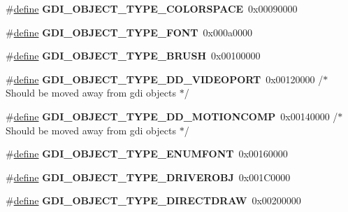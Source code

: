 \begin{DoxyCompactItemize}
\item 
\mbox{\label{group___g_d_i_ga6c5fb2b326a246390108711a94af6914}} 
\#\hyperlink{structdefine}{define} {\bfseries G\+D\+I\+\_\+\+O\+B\+J\+E\+C\+T\+\_\+\+T\+Y\+P\+E\+\_\+\+C\+O\+L\+O\+R\+S\+P\+A\+CE}~0x00090000
\item 
\mbox{\label{group___g_d_i_gabd2c418955f21cc36490373c88fe1a66}} 
\#\hyperlink{structdefine}{define} {\bfseries G\+D\+I\+\_\+\+O\+B\+J\+E\+C\+T\+\_\+\+T\+Y\+P\+E\+\_\+\+F\+O\+NT}~0x000a0000
\item 
\mbox{\label{group___g_d_i_ga3dc10db406ddc5ebbb58440871650cbf}} 
\#\hyperlink{structdefine}{define} {\bfseries G\+D\+I\+\_\+\+O\+B\+J\+E\+C\+T\+\_\+\+T\+Y\+P\+E\+\_\+\+B\+R\+U\+SH}~0x00100000
\item 
\mbox{\label{group___g_d_i_ga81113cb3a563fe5da18e8770cf5f3f5c}} 
\#\hyperlink{structdefine}{define} {\bfseries G\+D\+I\+\_\+\+O\+B\+J\+E\+C\+T\+\_\+\+T\+Y\+P\+E\+\_\+\+D\+D\+\_\+\+V\+I\+D\+E\+O\+P\+O\+RT}~0x00120000 /$\ast$ Should be moved away from gdi objects $\ast$/
\item 
\mbox{\label{group___g_d_i_ga512115651e7bb62d4e0ee6f4191f9736}} 
\#\hyperlink{structdefine}{define} {\bfseries G\+D\+I\+\_\+\+O\+B\+J\+E\+C\+T\+\_\+\+T\+Y\+P\+E\+\_\+\+D\+D\+\_\+\+M\+O\+T\+I\+O\+N\+C\+O\+MP}~0x00140000 /$\ast$ Should be moved away from gdi objects $\ast$/
\item 
\mbox{\label{group___g_d_i_gaefe2bee491891660621cb09828f4d089}} 
\#\hyperlink{structdefine}{define} {\bfseries G\+D\+I\+\_\+\+O\+B\+J\+E\+C\+T\+\_\+\+T\+Y\+P\+E\+\_\+\+E\+N\+U\+M\+F\+O\+NT}~0x00160000
\item 
\mbox{\label{group___g_d_i_gaa8a89e495e17509bfc0f91980ea752b5}} 
\#\hyperlink{structdefine}{define} {\bfseries G\+D\+I\+\_\+\+O\+B\+J\+E\+C\+T\+\_\+\+T\+Y\+P\+E\+\_\+\+D\+R\+I\+V\+E\+R\+O\+BJ}~0x001\+C0000
\item 
\mbox{\label{group___g_d_i_gaebcd8d319b322ac26d9305e258be8b2b}} 
\#\hyperlink{structdefine}{define} {\bfseries G\+D\+I\+\_\+\+O\+B\+J\+E\+C\+T\+\_\+\+T\+Y\+P\+E\+\_\+\+D\+I\+R\+E\+C\+T\+D\+R\+AW}~0x00200000

\end{DoxyCompactItemize}
